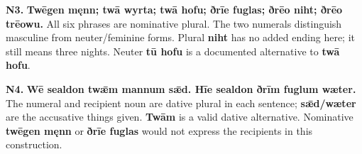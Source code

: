 \par\begin{minipage}{\linewidth}\raggedright
\textbf{N3.} \textbf{Twēgen męnn; twā wyrta; twā hofu; ðrīe fuglas; ðrēo niht; ðrēo trēowu.} All six phrases are nominative plural. The two numerals distinguish masculine from neuter/\allowbreak{}feminine forms. Plural \textbf{niht} has no added ending here; it still means three nights. Neuter \textbf{tū hofu} is a documented alternative to \textbf{twā hofu}.

\end{minipage}\par\addvspace{4pt}

\par\begin{minipage}{\linewidth}\raggedright
\textbf{N4.} \textbf{Wē sealdon twǣm mannum sǣd. Hīe sealdon ðrīm fuglum wæter.} The numeral and recipient noun are dative plural in each sentence; \textbf{sǣd/\allowbreak{}wæter} are the accusative things given. \textbf{Twām} is a valid dative alternative. Nominative \textbf{twēgen męnn} or \textbf{ðrīe fuglas} would not express the recipients in this construction.

\end{minipage}\par\addvspace{4pt}

